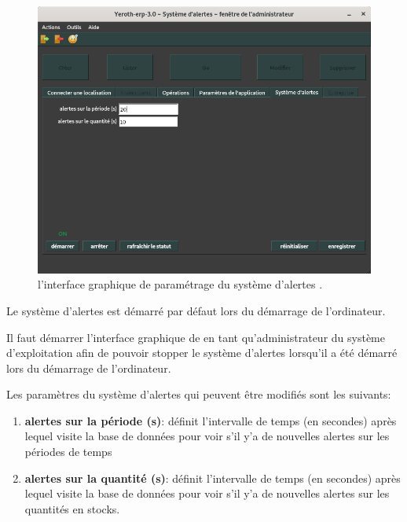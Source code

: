 \begin{figure}[!htpb]
	\centering
	\includegraphics[scale=0.45]{images/yeren-admin-alertes-config.png}
	\caption{l'interface graphique de param\'etrage du
		syst\`eme d'alertes \yeroth.}\label{fig:yeren-admin-alertes-config}
\end{figure}

Le syst\`eme d'alertes est d\'emarr\'e par d\'efaut lors du
d\'emarrage de l'ordinateur. 

Il faut d\'emarrer l'interface graphique de \yeroth en tant
qu'administrateur du syst\`eme d'exploitation afin de
pouvoir stopper le syst\`eme d'alertes lorsqu'il a \'et\'e
d\'emarr\'e lors du d\'emarrage de l'ordinateur.

Les param\`etres du syst\`eme d'alertes qui peuvent \^etre
modifi\'es sont les suivants:
\begin{enumerate}[1)]
	\item \textbf{alertes sur la p\'eriode (s)}: d\'efinit
		l'intervalle de temps (en secondes) apr\`es lequel
		\yeroth visite la base de donn\'ees pour voir
		s'il y'a de nouvelles alertes sur les p\'eriodes de temps
		
	\item \textbf{alertes sur la quantit\'e (s)}: d\'efinit
		l'intervalle de temps (en secondes) apr\`es lequel
		\yeroth visite la base de donn\'ees pour voir
		s'il y'a de nouvelles alertes sur les quantit\'es en stocks.\\
\end{enumerate}

